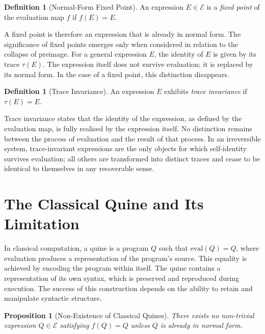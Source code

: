 \documentclass[12pt, oneside]{amsbook}
\theoremstyle{plain}
\newtheorem{proposition}[theorem]{Proposition}
\theoremstyle{definition}
\newtheorem{definition}[theorem]{Definition}
\theoremstyle{remark}
\newcommand{\Expr}{\mathcal{E}}
\newcommand{\evalf}{f}
\newcommand{\trace}{\tau}
\begin{document}
\begin{definition}[Normal-Form Fixed Point]
\label{def:fixedpoint}
  An expression $E \in \Expr$ is a \emph{fixed point} of the evaluation map
  $\evalf$ if $\evalf(E) = E$.
\end{definition}

A fixed point is therefore an expression that is already in normal form. The
significance of fixed points emerges only when considered in relation to the
collapse of preimage. For a general expression $E$, the identity of $E$ is
given by its trace $\trace(E)$. The expression itself does not survive
evaluation; it is replaced by its normal form. In the case of a fixed point,
this distinction disappears.

\begin{definition}[Trace Invariance]
\label{def:trace-invariance}
  An expression $E$ exhibits \emph{trace invariance} if $\trace(E) = E$.
\end{definition}

Trace invariance states that the identity of the expression, as defined by the
evaluation map, is fully realised by the expression itself. No distinction
remains between the process of evaluation and the result of that process. In an
irreversible system, trace-invariant expressions are the only objects for which
self-identity survives evaluation; all others are transformed into distinct
traces and cease to be identical to themselves in any recoverable sense.

\section{The Classical Quine and Its Limitation}
\label{sec:fixedpoints:classical}

In classical computation, a quine is a program $Q$ such that
$\mathrm{eval}(Q) = Q$, where evaluation produces a representation of the
program's source. This equality is achieved by encoding the program within
itself. The quine contains a representation of its own syntax, which is
preserved and reproduced during execution. The success of this construction
depends on the ability to retain and manipulate syntactic structure.

\begin{proposition}[Non-Existence of Classical Quines]
\label{prop:no-classical-quines}
  There exists no non-trivial expression $Q \in \Expr$ satisfying
  $\evalf(Q) = Q$ unless $Q$ is already in normal form.
\end{proposition}
\end{document}
